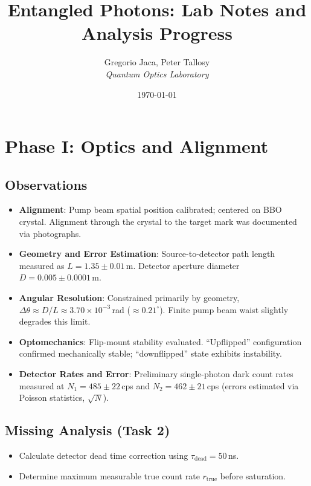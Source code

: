 \documentclass[11pt,a4paper]{article}
\begin{document}
\title{Entangled Photons: Lab Notes and Analysis Progress}
\author{Gregorio Jaca, Peter Tallosy\\ \textit{Quantum Optics Laboratory}}
\date{\today}



\maketitle

\section{Phase I: Optics and Alignment}
\subsection{Observations}
\begin{itemize}
    \item \textbf{Alignment}: Pump beam spatial position calibrated; centered on BBO crystal. Alignment through the crystal to the target mark was documented via photographs.
    \item \textbf{Geometry and Error Estimation}: Source-to-detector path length measured as $L = 1.35 \pm 0.01$\,m. Detector aperture diameter $D = 0.005 \pm 0.0001$\,m. 
    \item \textbf{Angular Resolution}: Constrained primarily by geometry, $\Delta\theta \approx D/L \approx 3.70 \times 10^{-3}$\,rad ($\approx 0.21^\circ$). Finite pump beam waist slightly degrades this limit.
    \item \textbf{Optomechanics}: Flip-mount stability evaluated. ``Upflipped'' configuration confirmed mechanically stable; ``downflipped'' state exhibits instability.
    \item \textbf{Detector Rates and Error}: Preliminary single-photon dark count rates measured at $N_1 = 485 \pm 22$\,cps and $N_2 = 462 \pm 21$\,cps (errors estimated via Poisson statistics, $\sqrt{N}$). 
\end{itemize}

\subsection{Missing Analysis (Task 2)}
\begin{itemize}
    \item Calculate detector dead time correction using $\tau_{\text{dead}} = 50$\,ns.
    \item Determine maximum measurable true count rate $r_{\text{true}}$ before saturation.
\end{itemize}
\end{document}
